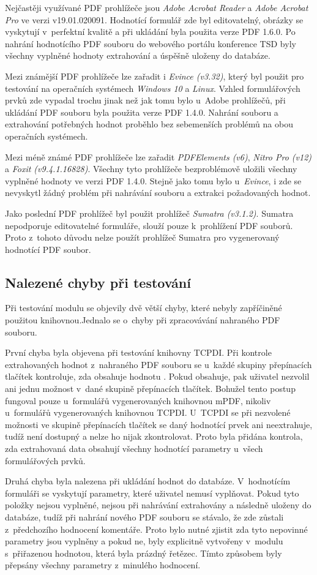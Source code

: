 \par
Nejčastěji využívané PDF prohlížeče jsou \textit{Adobe Acrobat Reader} a \textit{Adobe Acrobat Pro} ve verzi v19.01.020091. Hodnotící formulář zde byl editovatelný, obrázky se vyskytují v~perfektní kvalitě a při ukládání byla použita verze PDF 1.6.0. Po nahrání hodnotícího PDF souboru do webového portálu konference TSD byly všechny vyplněné hodnoty extrahování a úspěšně uloženy do databáze.
\par
Mezi známější PDF prohlížeče lze zařadit i \textit{Evince (v3.32)}, který byl použit pro testování na operačních systémech \textit{Windows 10} a \textit{Linux}. Vzhled formulářových prvků zde vypadal trochu jinak než jak tomu bylo u~Adobe prohlížečů, při ukládání PDF souboru byla použita verze PDF 1.4.0. Nahrání souboru a extrahování potřebných hodnot proběhlo bez sebemenších problémů na obou operačních systémech.
\par
Mezi méně známé PDF prohlížeče lze zařadit \textit{PDFElements (v6)}, \textit{Nitro Pro (v12)} a \textit{Foxit (v9.4.1.16828)}. Všechny tyto prohlížeče bezproblémově uložili všechny vyplněné hodnoty ve verzi PDF 1.4.0. Stejně jako tomu bylo u~\textit{Evince}, i zde se nevyskytl žádný problém při nahrávání souboru a extrakci požadovaných hodnot.
\par
Jako poslední PDF prohlížeč byl použit prohlížeč \textit{Sumatra (v3.1.2)}. Sumatra nepodporuje editovatelné formuláře, slouží pouze k~prohlížení PDF souborů. Proto z~tohoto důvodu nelze použít prohlížeč Sumatra pro vygenerovaný hodnotící PDF soubor.

\subsection{Nalezené chyby při testování}
Při testování modulu se objevily dvě větší chyby, které nebyly zapříčiněné použitou knihovnou.Jednalo se o~chyby při zpracovávání nahraného PDF souboru.
\par
První chyba byla objevena při testování knihovny TCPDI. Při kontrole extrahovaných hodnot z~nahraného PDF souboru se u~každé skupiny přepínacích tlačítek kontroluje, zda obsahuje hodnotu . Pokud obsahuje, pak uživatel nezvolil ani jednu možnost v~dané skupině přepínacích tlačítek. Bohužel tento postup fungoval pouze u~formulářů vygenerovaných knihovnou mPDF, nikoliv u~formulářů vygenerovaných knihovnou TCPDI. U~TCPDI se při nezvolené možnosti ve skupině přepínacích tlačítek se daný hodnotící prvek ani neextrahuje, tudíž není dostupný a nelze ho nijak zkontrolovat. Proto byla přidána kontrola, zda extrahovaná data obsahují všechny hodnotící parametry u~všech formulářových prvků.
\par
Druhá chyba byla nalezena při ukládání hodnot do databáze. V~hodnotícím formuláři se vyskytují parametry, které uživatel nemusí vyplňovat. Pokud tyto položky nejsou vyplněné, nejsou při nahrávání extrahovány a následně uloženy do databáze, tudíž při nahrání nového PDF souboru se stávalo, že zde zůstali z~předchozího hodnocení komentáře. Proto bylo nutné zjistit zda tyto nepovinné parametry jsou vyplněny a pokud ne, byly explicitně vytvořeny v~modulu s~přiřazenou hodnotou, která byla prázdný řetězec. Tímto způsobem byly přepsány všechny parametry z~minulého hodnocení.

